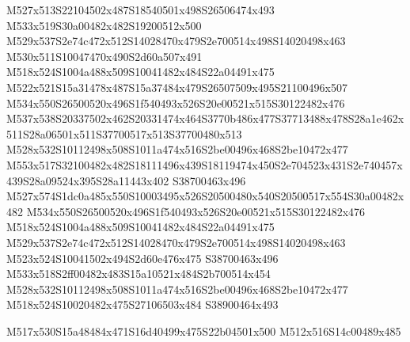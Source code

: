 \documentclass{article}
\begin{document}
\begin{multicols}{2}






M527x513S22104502x487S18540501x498S26506474x493 M533x519S30a00482x482S19200512x500 M529x537S2e74c472x512S14028470x479S2e700514x498S14020498x463 M530x511S10047470x490S2d60a507x491 M518x524S1004a488x509S10041482x484S22a04491x475 M522x521S15a31478x487S15a37484x479S26507509x495S21100496x507 M534x550S26500520x496S1f540493x526S20e00521x515S30122482x476 M537x538S20337502x462S20331474x464S3770b486x477S37713488x478S28a1e462x511S28a06501x511S37700517x513S37700480x513 M528x532S10112498x508S1011a474x516S2be00496x468S2be10472x477 M553x517S32100482x482S18111496x439S18119474x450S2e704523x431S2e740457x439S28a09524x395S28a11443x402 S38700463x496 M527x574S1dc0a485x550S10003495x526S20500480x540S20500517x554S30a00482x482 M534x550S26500520x496S1f540493x526S20e00521x515S30122482x476 M518x524S1004a488x509S10041482x484S22a04491x475 M529x537S2e74c472x512S14028470x479S2e700514x498S14020498x463 M523x524S10041502x494S2d60e476x475 S38700463x496 M533x518S2ff00482x483S15a10521x484S2b700514x454 M528x532S10112498x508S1011a474x516S2be00496x468S2be10472x477 M518x524S10020482x475S27106503x484 S38900464x493


\begin{center}
M517x530S15a48484x471S16d40499x475S22b04501x500 M512x516S14c00489x485 
\end{center}



\end{multicols}
\end{document}
